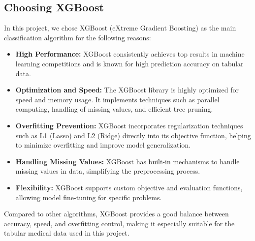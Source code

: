 \subsection{Choosing XGBoost}

In this project, we chose XGBoost (eXtreme Gradient Boosting) as the main classification algorithm for the following reasons:
\begin{itemize}
    \item \textbf{High Performance:} XGBoost consistently achieves top results in machine learning competitions and is known for high prediction accuracy on tabular data.
    \item \textbf{Optimization and Speed:} The XGBoost library is highly optimized for speed and memory usage. It implements techniques such as parallel computing, handling of missing values, and efficient tree pruning.
    \item \textbf{Overfitting Prevention:} XGBoost incorporates regularization techniques such as L1 (Lasso) and L2 (Ridge) directly into its objective function, helping to minimize overfitting and improve model generalization.
    \item \textbf{Handling Missing Values:} XGBoost has built-in mechanisms to handle missing values in data, simplifying the preprocessing process.
    \item \textbf{Flexibility:} XGBoost supports custom objective and evaluation functions, allowing model fine-tuning for specific problems.
\end{itemize}

Compared to other algorithms, XGBoost provides a good balance between accuracy, speed, and overfitting control, making it especially suitable for the tabular medical data used in this project.

